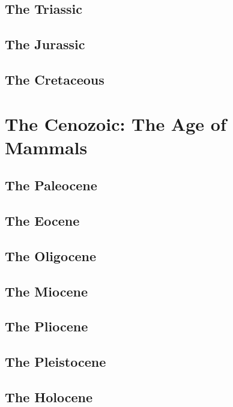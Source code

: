 \documentclass[10pt]{report}
\begin{document}
	\section{The Triassic}
	\section{The Jurassic}
	\section{The Cretaceous}
	\chapter{The Cenozoic: The Age of Mammals}
	\section{The Paleocene}
	\section{The Eocene}
	\section{The Oligocene}
	\section{The Miocene}
	\section{The Pliocene}
	\section{The Pleistocene}
	\section{The Holocene}
\end{document}
